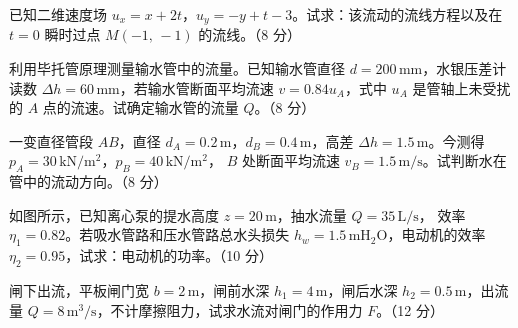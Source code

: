 \begin{ti}
  \item 已知二维速度场 $u_x=x+2t$，$u_y=-y+t-3$。试求：该流动的流线方程以及在
  $t=0$ 瞬时过点 $M(-1,\,-1)$ 的流线。（8 分）\hfill{}

  \item 利用毕托管原理测量输水管中的流量。已知输水管直径 $d=200\,\mathrm{mm}$，水银压差计读数
  $\Delta h=60\,\mathrm{mm}$，若输水管断面平均流速 $v=0.84u_A$，式中 $u_A$ 是管轴上未受扰的 $A$
  点的流速。试确定输水管的流量 $Q$。（8 分）\hfill{}

  \item 一变直径管段 $AB$，直径 $d_A=0.2\,\mathrm{m}$，$d_B=0.4\,\mathrm{m}$，高差
  $\Delta h=1.5\,\mathrm{m}$。今测得 $p_A=30\,\mathrm{kN/m^2}$，$p_B=40\,\mathrm{kN/m^2}$，
  $B$ 处断面平均流速 $v_B=1.5\,\mathrm{m/s}$。试判断水在管中的流动方向。（8 分）\hfill{}

  \item 如图所示，已知离心泵的提水高度 $z=20\,\mathrm{m}$，抽水流量 $Q=35\,\mathrm{L/s}$，
  效率 $\eta_1=0.82$。若吸水管路和压水管路总水头损失 $h_w=1.5\,\mathrm{mH_2O}$，电动机的效率
  $\eta_2=0.95$，试求：电动机的功率。（10 分）\hfill{}

  \item 闸下出流，平板闸门宽 $b=2\,\mathrm{m}$，闸前水深 $h_1=4\,\mathrm{m}$，闸后水深
  $h_2=0.5\,\mathrm{m}$，出流量 $Q=8\,\mathrm{m^3/s}$，不计摩擦阻力，试求水流对闸门的作用力 $F$。（12 分）\hfill{}


\end{ti}
